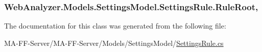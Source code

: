 \subsubsection[{Rule\+Root}]{ Web\+Analyzer.\+Models.\+Settings\+Model.\+Settings\+Rule.\+Rule\+Root\hspace{0.3cm}{\ttfamily [get]}, {\ttfamily [set]}}\label{class_web_analyzer_1_1_models_1_1_settings_model_1_1_settings_rule_a4f1e8ed93d01d4d4bd68a8482286a0f3}


The documentation for this class was generated from the following file\+:\begin{DoxyCompactItemize}
\item 
M\+A-\/\+F\+F-\/\+Server/\+M\+A-\/\+F\+F-\/\+Server/\+Models/\+Settings\+Model/\hyperlink{_settings_rule_8cs}{Settings\+Rule.\+cs}\end{DoxyCompactItemize}
